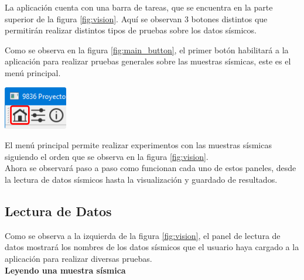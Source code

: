 \documentclass[12pt,oneside,a4]{ol-softwaremanual}
\newcommand*\circled[1]{\tikz[baseline=(char.base)]{
            \node[shape=circle,draw,inner sep=2pt] (char) {#1};}}
\newenvironment{Figure}
  {\par\medskip\noindent\minipage{\linewidth}}
  {\endminipage\par\medskip}
\begin{document}
La aplicación cuenta con una barra de tareas, que se encuentra en la parte superior \circled{1} de la figura \ref{fig:vision}. Aquí se observan 3 botones distintos que permitirán realizar distintos tipos de pruebas sobre los datos sísmicos.


\begin{multicols}{2}

Como se observa en la figura \ref{fig:main_button}, el primer botón habilitará a la aplicación para realizar pruebas generales sobre las muestras sísmicas, este es el menú principal.

\begin{Figure}
    \centering
    \includegraphics[width=0.3\linewidth]{main-tab.png}
    \label{fig:main_button}
\end{Figure}

\end{multicols}

El menú principal permite realizar experimentos con las muestras sísmicas siguiendo el orden que se observa en la figura \ref{fig:vision}. \\

Ahora se observará paso a paso como funcionan cada uno de estos paneles, desde la lectura de datos sísmicos hasta la visualización y guardado de resultados.


\subsection{Lectura de Datos}

Como se observa a la izquierda \circled{2} de la figura \ref{fig:vision}, el panel de lectura de datos mostrará los nombres de los datos sísmicos que el usuario haya cargado a la aplicación para realizar diversas pruebas.\\

\textbf{Leyendo una muestra sísmica} \label{sec:data_lecture}
\end{document}
